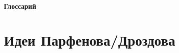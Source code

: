\documentclass[12pt, a4paper]{report}
\begin{document}
\tableofcontents

\newpage
\begin{center}
  \textbf{\large Глоссарий}
\end{center}



\newpage
\chapter{Идеи Парфенова/Дроздова}




\renewcommand{\bibname}{Использованные источники}


\end{document}
